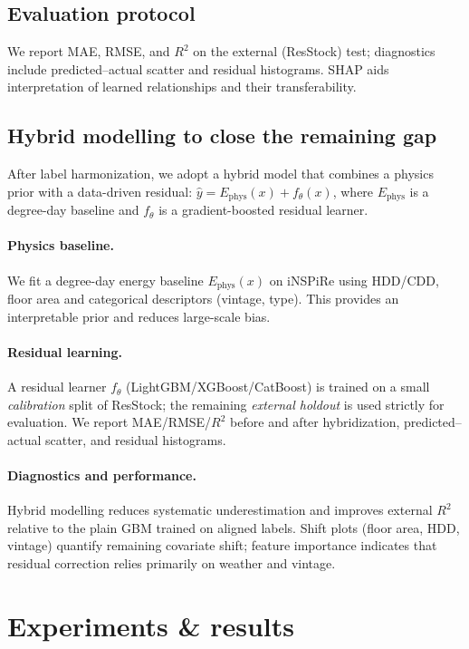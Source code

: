 \documentclass{article}
\begin{document}
\subsection{Evaluation protocol}
We report MAE, RMSE, and $R^2$ on the external (ResStock) test; diagnostics include predicted--actual scatter and residual histograms. SHAP aids interpretation of learned relationships and their transferability.
\subsection{Hybrid modelling to close the remaining gap}
After label harmonization, we adopt a hybrid model that combines a physics prior with a data-driven residual:
$\hat y = E_{\mathrm{phys}}(x) + f_{\theta}(x)$, where $E_{\mathrm{phys}}$ is a degree-day baseline and $f_{\theta}$ is a gradient-boosted residual learner.

\paragraph{Physics baseline.}
We fit a degree-day energy baseline $E_{\mathrm{phys}}(x)$ on iNSPiRe using HDD/CDD, floor area and categorical descriptors (vintage, type). This provides an interpretable prior and reduces large-scale bias.

\paragraph{Residual learning.}
A residual learner $f_{\theta}$ (LightGBM/XGBoost/CatBoost) is trained on a small \emph{calibration} split of ResStock; the remaining \emph{external holdout} is used strictly for evaluation. We report MAE/RMSE/$R^2$ before and after hybridization, predicted--actual scatter, and residual histograms.

\paragraph{Diagnostics and performance.}
Hybrid modelling reduces systematic underestimation and improves external $R^2$ relative to the plain GBM trained on aligned labels. Shift plots (floor area, HDD, vintage) quantify remaining covariate shift; feature importance indicates that residual correction relies primarily on weather and vintage.

\section{Experiments \& results}
\end{document}
